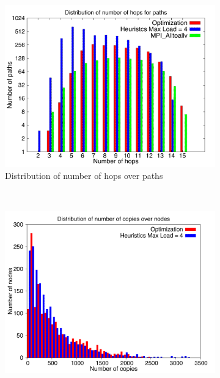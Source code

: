 \begin{figure}[!htbp]
        \centering
        \begin{subfigure}[b]{0.49\textwidth}
                \includegraphics[width=\textwidth]{report_figures/constantr/3_2048/hop_histo.pdf}
                \caption{Distribution of number of hops over paths}
                \label{fig:3_2048_hop}
        \end{subfigure}%
        ~ %
        \begin{subfigure}[b]{0.49\textwidth}
                \includegraphics[width=\textwidth]{report_figures/constantr/3_2048/copy_histo.pdf}

\end{subfigure}
\end{figure}
